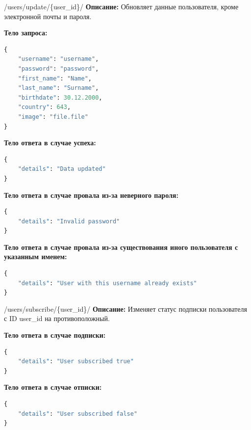 \documentclass[a4paper,14pt]{extarticle}
\begin{document}
	\begin{putapi}{/users/update/\{user\_id\}/}
		\textbf{Описание:} Обновляет данные пользователя, кроме электронной почты и пароля.\medskip
		
		\textbf{Тело запроса:}
		\begin{lstlisting}[language=Python]
{
    "username": "username",
    "password": "password",
    "first_name": "Name",
    "last_name": "Surname",
    "birthdate": 30.12.2000,
    "country": 643,
    "image": "file.file"
}
		\end{lstlisting}
		
		\textbf{Тело ответа в случае успеха:}
		\begin{lstlisting}[language=Python]
{
    "details": "Data updated"
}
		\end{lstlisting}
		
		\textbf{Тело ответа в случае провала из-за неверного пароля:}
		\begin{lstlisting}[language=Python]
{
    "details": "Invalid password"
}
		\end{lstlisting}
		
		\textbf{Тело ответа в случае провала из-за существования иного пользователя с указанным именем:}
		\begin{lstlisting}[language=Python]
{
    "details": "User with this username already exists"
}
		\end{lstlisting}
	\end{putapi}
	
	\begin{putapi}{/users/subscribe/\{user\_id\}/}
		\textbf{Описание:} Изменяет статус подписки пользователя с ID user\_id на противоположный.\medskip
		
		\textbf{Тело ответа в случае подписки:}
		\begin{lstlisting}[language=Python]
{
    "details": "User subscribed true"
}
		\end{lstlisting}
		
		\textbf{Тело ответа в случае отписки:}
		\begin{lstlisting}[language=Python]
{
    "details": "User subscribed false"
}
		\end{lstlisting}
	\end{putapi}
	
\end{document}
